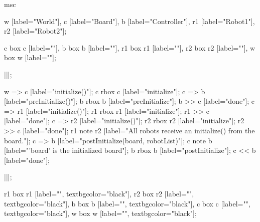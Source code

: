 \begin{msc}
msc
{

w [label="World"],
c [label="Board"],
b [label="Controller"],
r1 [label="Robot1"],
r2 [label="Robot2"];

c box c [label=""],
b box b [label=""],
r1 box r1 [label=""],
r2 box r2 [label=""],
w box w [label=""];

|||;

w => c [label="initialize()"];
c rbox c [label="initialize"];
c => b [label="preInitialize()"];
b rbox b [label="preInitialize"];
b >> c [label="done"];
c => r1 [label="initialize()"];
r1 rbox r1 [label="initialize"];
r1 >> c [label="done"];
c => r2 [label="initialize()"];
r2 rbox r2 [label="initialize"];
r2 >> c [label="done"];
r1 note r2 [label="All robots receive an initialize() from the board."];
c => b [label="postInitialize(board, robotList)"];
c note b [label="'board' is the initialized board"];
b rbox b [label="postInitialize"];
c << b [label="done"];

|||;

r1 box r1 [label="", textbgcolor="black"],
r2 box r2 [label="", textbgcolor="black"],
b box b [label="", textbgcolor="black"],
c box c [label="", textbgcolor="black"],
w box w [label="", textbgcolor="black"];

}
\end{msc}
